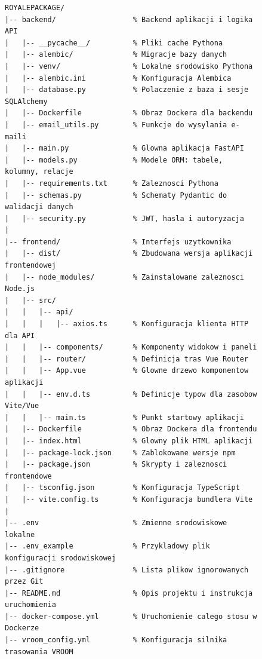 \begin{figure}[H]
\centering
\begin{minipage}{0.95\textwidth}
\begin{lstlisting}[basicstyle=\ttfamily\scriptsize, frame=single, caption={Struktura projektu RoyalePackage}, label={lst:struktura-projektu}, breaklines=true, breakatwhitespace=true, columns=fullflexible, keepspaces=true, showstringspaces=false]
ROYALEPACKAGE/
|-- backend/                  % Backend aplikacji i logika API
|   |-- __pycache__/          % Pliki cache Pythona
|   |-- alembic/              % Migracje bazy danych
|   |-- venv/                 % Lokalne srodowisko Pythona
|   |-- alembic.ini           % Konfiguracja Alembica
|   |-- database.py           % Polaczenie z baza i sesje SQLAlchemy
|   |-- Dockerfile            % Obraz Dockera dla backendu
|   |-- email_utils.py        % Funkcje do wysylania e-maili
|   |-- main.py               % Glowna aplikacja FastAPI
|   |-- models.py             % Modele ORM: tabele, kolumny, relacje
|   |-- requirements.txt      % Zaleznosci Pythona
|   |-- schemas.py            % Schematy Pydantic do walidacji danych
|   |-- security.py           % JWT, hasla i autoryzacja
|
|-- frontend/                 % Interfejs uzytkownika
|   |-- dist/                 % Zbudowana wersja aplikacji frontendowej
|   |-- node_modules/         % Zainstalowane zaleznosci Node.js
|   |-- src/
|   |   |-- api/
|   |   |   |-- axios.ts      % Konfiguracja klienta HTTP dla API
|   |   |-- components/       % Komponenty widokow i paneli
|   |   |-- router/           % Definicja tras Vue Router
|   |   |-- App.vue           % Glowne drzewo komponentow aplikacji
|   |   |-- env.d.ts          % Definicje typow dla zasobow Vite/Vue
|   |   |-- main.ts           % Punkt startowy aplikacji
|   |-- Dockerfile            % Obraz Dockera dla frontendu
|   |-- index.html            % Glowny plik HTML aplikacji
|   |-- package-lock.json     % Zablokowane wersje npm
|   |-- package.json          % Skrypty i zaleznosci frontendowe
|   |-- tsconfig.json         % Konfiguracja TypeScript
|   |-- vite.config.ts        % Konfiguracja bundlera Vite
|
|-- .env                      % Zmienne srodowiskowe lokalne
|-- .env_example              % Przykladowy plik konfiguracji srodowiskowej
|-- .gitignore                % Lista plikow ignorowanych przez Git
|-- README.md                 % Opis projektu i instrukcja uruchomienia
|-- docker-compose.yml        % Uruchomienie calego stosu w Dockerze
|-- vroom_config.yml          % Konfiguracja silnika trasowania VROOM
\end{lstlisting}
\end{minipage}
\end{figure}